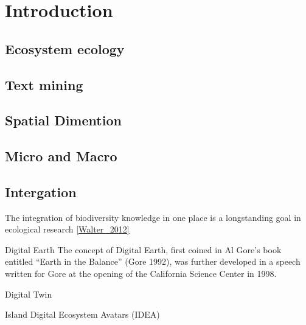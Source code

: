 % 
% 


\chapter{Introduction}
\label{cha:intro}



\section{Ecosystem ecology}
\label{sec:intro-ecosystem}

\section{Text mining}
\label{sec:text-mining}

\section{Spatial Dimention}
\label{sec:crete-spatial}

\section{Micro and Macro}
\label{sec:crete-micro-macro}


\section{Intergation}
\label{sec:integration}

The integration of biodiversity knowledge in one place is a longstanding
goal in ecological research \ref{Walter_2012}

Digital Earth
The concept of Digital Earth, first coined in Al Gore’s book entitled 
“Earth in the Balance” (Gore 1992), was further developed in a speech
written for Gore at the opening of the California Science Center in 1998.

Digital Twin

Island Digital Ecosystem Avatars (IDEA)

